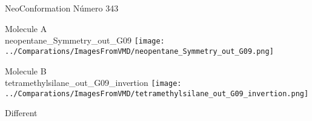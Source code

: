  \newpage

\vtab[-2cm]
\begin{center}
{\large NeoConformation \tab Número 343}
\end{center}
\begin{multicols}{2}
\begin{center}
Molecule A \\ 
neopentane\_Symmetry\_out\_G09
\texttt{[image: ../Comparations/ImagesFromVMD/neopentane\_Symmetry\_out\_G09.png]}
\\
\vtab

\columnbreak
Molecule B \\ 
tetramethylsilane\_out\_G09\_invertion
\texttt{[image: ../Comparations/ImagesFromVMD/tetramethylsilane\_out\_G09\_invertion.png]}
\\
\vtab


\end{center}
\end{multicols}
\begin{center}
\vtab
\vtab
\textcolor{NavyBlue}{\Large Different}
\end{center}

 \newpage

